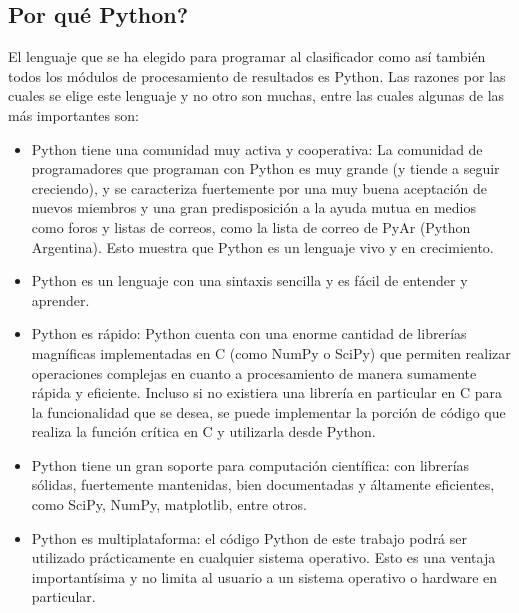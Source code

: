 	\subsection{Por qué Python?}	
	
	El lenguaje que se ha elegido para programar al clasificador como así también todos los módulos de procesamiento de resultados es Python. Las razones por las cuales se elige este lenguaje y no otro son muchas, entre las cuales algunas de las más importantes son:
	
			\begin{itemize}
	
			\item Python tiene una comunidad muy activa y cooperativa: La comunidad de programadores que programan con Python es muy grande (y tiende a seguir creciendo), y se caracteriza fuertemente por una muy buena aceptación de nuevos miembros y una gran predisposición a la ayuda mutua en medios como foros y listas de correos, como la lista de correo de PyAr (Python Argentina). Esto muestra que Python es un lenguaje vivo y en crecimiento.
			
			\item Python es un lenguaje con una sintaxis sencilla y es fácil de entender y aprender.
			
			\item Python es rápido: Python cuenta con una enorme cantidad de librerías magníficas implementadas en C (como NumPy o SciPy) que permiten realizar operaciones complejas en cuanto a procesamiento de manera sumamente rápida y eficiente. Incluso si no existiera una librería en particular en C para la funcionalidad que se desea, se puede implementar la porción de código que realiza la función crítica en C y utilizarla desde Python.
			
			\item Python tiene un gran soporte para computación científica: con librerías sólidas, fuertemente mantenidas, bien documentadas y áltamente eficientes, como SciPy, NumPy, matplotlib, entre otros.
			
			\item Python es multiplataforma: el código Python de este trabajo podrá ser utilizado prácticamente en cualquier sistema operativo. Esto es una ventaja importantísima y no limita al usuario a un sistema operativo o hardware en particular.
			\end{itemize}
	